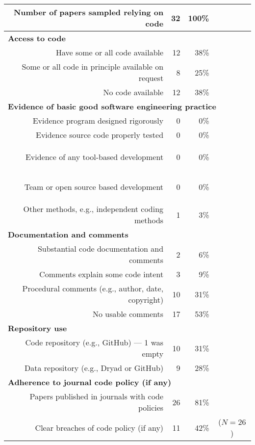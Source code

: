 \begin{tabular}{|rrrc|}\hline
Number of papers sampled relying on code&32&100\%&\\\hline\hline
\multicolumn{4}{|l|}{\textbf{Access to code}}\\
Have some or all code available&12&38\%&\\
Some or all code in principle available on request&8&25\%&\\
No code available&12&38\%&\\\hline
\multicolumn{4}{|l|}{{\textbf{Evidence of basic good software engineering practice}}}\\
Evidence program designed rigorously&{0}&{0\%}&\\
Evidence source code properly tested&{0}&{0\%}&\\
\begin{change}Evidence of any tool-based development\end{change}&{\begin{change}0\end{change}}&{\begin{change}0\%\end{change}}&\\
\begin{change}Team or open source based development\end{change}&{\begin{change}0\end{change}}&{\begin{change}0\%\end{change}}&\\
Other methods, e.g., independent coding methods&{1}&{3\%}&\\\hline
\multicolumn{4}{|l|}{\textbf{Documentation and comments}}\\
Substantial code documentation and comments&2&6\%&\\
Comments explain some code intent&3&9\%&\\
Procedural comments (e.g., author, date, copyright)&10&31\%&\\
No usable comments&17&53\%&\\\hline
\multicolumn{4}{|l|}{\textbf{Repository use}}\\
Code repository (e.g., GitHub) --- 1 was empty&10&31\%&\\
Data repository (e.g., Dryad or GitHub)&9&28\%&\\\hline
\multicolumn{4}{|l|}{\textbf{Adherence to journal code policy (if any)}}\\
Papers published in journals with code policies&26&81\%&\\
Clear breaches of code policy (if any) & 11&42\%&($N=26$)\\
\hline\end{tabular}
